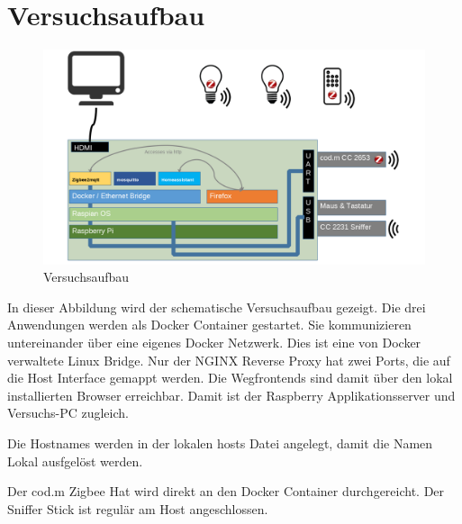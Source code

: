 \chapter{Versuchsaufbau}

\begin{figure}[H]
    \centering
    \includegraphics[width=1\textwidth]{media/Versuchsaufbau/image1.png}
    \caption{Versuchsaufbau}
  \end{figure}

In dieser Abbildung wird der schematische Versuchsaufbau gezeigt. Die drei Anwendungen werden als Docker Container gestartet. Sie kommunizieren
untereinander über eine eigenes Docker Netzwerk. Dies ist eine von Docker verwaltete Linux Bridge. Nur der NGINX Reverse Proxy hat zwei Ports, die
auf die Host Interface gemappt werden. Die Wegfrontends sind damit über den lokal installierten Browser erreichbar. Damit ist der Raspberry Applikationsserver
und Versuchs-PC zugleich.

Die Hostnames werden in der lokalen hosts Datei angelegt, damit die Namen Lokal ausfgelöst werden.

Der cod.m Zigbee Hat wird direkt an den Docker Container durchgereicht. Der Sniffer Stick ist regulär am Host angeschlossen. 
